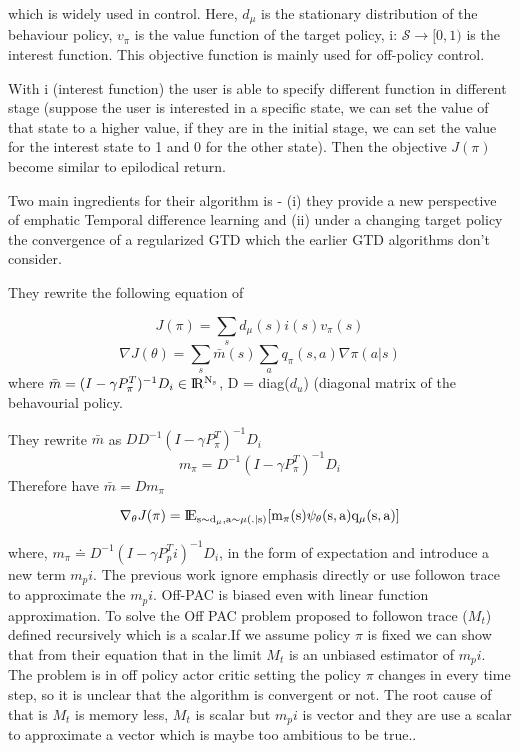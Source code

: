  which is widely used in control. Here, $d_\mu$ is the stationary distribution of the behaviour policy, $v_\pi$ is the value function of the target policy, i: $\mathcal{S} \rightarrow [0,1)$ is the interest function. This objective function is mainly used for off-policy control.

 With i (interest function) the user is able to specify different function in different stage (suppose the user is interested in a specific state, we can set the value of that state to a higher value, if they are in the initial stage, we can set the value for the interest state to 1 and 0 for the other state). Then the objective $J(\pi)$ become similar to epilodical return.
 
 Two main ingredients for their algorithm is - (i) they provide a new perspective of emphatic Temporal difference learning and (ii) under a changing target policy the convergence of a regularized GTD which the earlier GTD algorithms don't consider. 
 
 
 They rewrite the following equation of  \cite{imani2018off}
 
 
 \begin{equation}
     J(\pi)=\sum_sd_\mu(s)i(s)v_\pi(s)
 \end{equation}
 \begin{equation}
     \nabla J(\theta)=\sum_s\bar{m}(s)\sum_aq_\pi(s,a)\nabla\pi(a|s)
 \end{equation}
 where $\bar{m}=(I-\gamma P^{T}_{\pi})^{-1}D_i \in \rm I\!R^{N_s}$, D = diag($d_u$) (diagonal matrix of the behavourial policy.
 
 They rewrite $\bar{m}$ as $DD^{-1}(I-\gamma P^{T}_\pi)^{-1}D_i$
 \begin{equation}
    m_\pi= D^{-1}(I-\gamma P^{T}_\pi)^{-1}D_i
 \end{equation}
 Therefore have $\bar{m}=Dm_\pi$
 
 \begin{equation}
     \nabla_\theta J(\pi)=\rm I\!E_{s\sim d_\mu,a \sim \mu(.|s)}[m_{\pi}(s)\psi_\theta(s,a)q_\mu(s,a)]
 \end{equation}

 where, $m_\pi\doteq D^{-1}(I-\gamma P^T_pi)^{-1}D_i$, in the form of expectation and introduce a new term $m_pi$. The previous work ignore emphasis directly \cite{degris2012off} or use followon trace to approximate the $m_pi$.  Off-PAC is biased even with linear function approximation. To solve the Off PAC problem \cite{imani2018off} proposed to followon trace ($M_t$) defined recursively which is a scalar.If we assume policy $\pi$ is fixed we can show that from their equation that in the limit $M_t$ is an unbiased estimator of $m_pi$. The problem is in off policy actor critic setting the policy $\pi$ changes in every time step, so it is unclear that the \cite{imani2018off} algorithm is convergent or not. The root cause of that is $M_t$ is memory less, $M_t$  is scalar but $m_pi$ is vector and they are use a scalar to approximate a vector which is maybe too ambitious to be true.\cite{imani2018off}.


